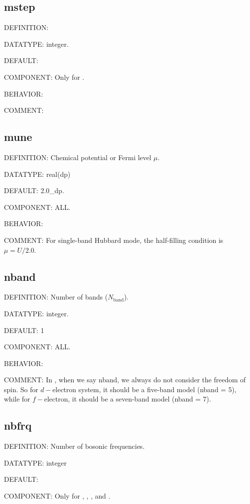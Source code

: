 \subsection{mstep}
{\color{red}DEFINITION:}

{\color{green}DATATYPE:} integer.

{\color{blue}DEFAULT:}

{\color{brown}COMPONENT:} Only for {\daisy}.

{\color{purple}BEHAVIOR:}

{\color{olive}COMMENT:}

\subsection{mune}
{\color{red}DEFINITION:} Chemical potential or Fermi level $\mu$.

{\color{green}DATATYPE:} real(dp)

{\color{blue}DEFAULT:} 2.0\_dp.

{\color{brown}COMPONENT:} ALL.

{\color{purple}BEHAVIOR:}

{\color{olive}COMMENT:} For single-band Hubbard mode, the half-filling condition is $\mu = U/2.0$.

\subsection{nband}
{\color{red}DEFINITION:} Number of bands ($N_{\text{band}}$).

{\color{green}DATATYPE:} integer.

{\color{blue}DEFAULT:} 1

{\color{brown}COMPONENT:} ALL.

{\color{purple}BEHAVIOR:}

{\color{olive}COMMENT:} In {\iqist}, when we say nband, we always do not consider the freedom of spin. So for $d-$electron system, it should be a five-band model (nband = 5), while for $f-$electron, it should be a seven-band model (nband = 7).

\subsection{nbfrq}
{\color{red}DEFINITION:} Number of bosonic frequencies.

{\color{green}DATATYPE:} integer

{\color{blue}DEFAULT:}

{\color{brown}COMPONENT:} Only for {\gardenia}, {\narcissus}, {\lavender}, and {\manjushaka}.

